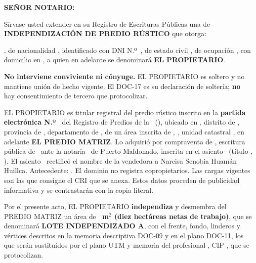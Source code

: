 \documentclass[12pt,a4paper]{article}
\begin{document}


\noindent \textbf{SEÑOR NOTARIO:}

\vspace{0.25em}
\noindent Sírvase usted extender en su Registro de Escrituras Públicas una de \textbf{INDEPENDIZACIÓN DE PREDIO RÚSTICO} que otorga:

\vspace{0.2em}
\noindent \textbf{\VendedorNombreCompleto}, de nacionalidad \VendedorNacionalidad, identificado con DNI N.º\ \VendedorDNI, de estado civil \VendedorEstadoCivil, de ocupación \VendedorOcupacion, con domicilio en \VendedorDomicilio, a quien en adelante se denominará \textbf{EL PROPIETARIO}.

\vspace{0.15em}
\noindent \textbf{No interviene conviviente ni cónyuge.} EL PROPIETARIO es soltero y no mantiene unión de hecho vigente. El DOC-17 es su declaración de soltería; \textbf{no} hay consentimiento de tercero que protocolizar.

EL PROPIETARIO es titular registral del predio rústico inscrito en la \textbf{partida electrónica N.º\ \PartidaMatriz} del Registro de Predios de la \OficinaRegistral\ (\ZonaRegistral), ubicado en \UbicacionRegistral, distrito de \Distrito, provincia de \Provincia, departamento de \Departamento, de un área inscrita de \AreaMatriz, \NombreFundo, unidad catastral \UnidadCatastral, en adelante \textbf{EL PREDIO MATRIZ}. Lo adquirió por compraventa de \VendedoresAnteriores, escritura pública de \FechaAdquisicionMatriz\ ante la notaria \NotarioAdquisicion\ de Puerto Maldonado, inscrita en el asiento \AsientoDominio\ (título \TituloSunarpDominio, \FechaInscripcionDominio). El asiento \AsientoRectificacion\ rectificó el nombre de la vendedora a Narcisa Senobia Huamán Huillca. Antecedente: \FichaAntecedente. El dominio no registra copropietarios. Las cargas vigentes son las que consigne el CRI que se anexa. Estos datos proceden de publicidad informativa y se contrastarán con la copia literal.

Por el presente acto, EL PROPIETARIO \textbf{independiza} y desmembra del PREDIO MATRIZ un área de \textbf{\AreaIndependizarMetros\ m$^2$ (diez hectáreas netas de trabajo)}, que se denominará \textbf{LOTE INDEPENDIZADO A}, con el frente, fondo, linderos y vértices descritos en la memoria descriptiva DOC-09 y en el plano DOC-11, los que serán sustituidos por el plano UTM y memoria del profesional \IngenieroNombre, CIP \IngenieroCIP, que se protocolizan.
\end{document}

